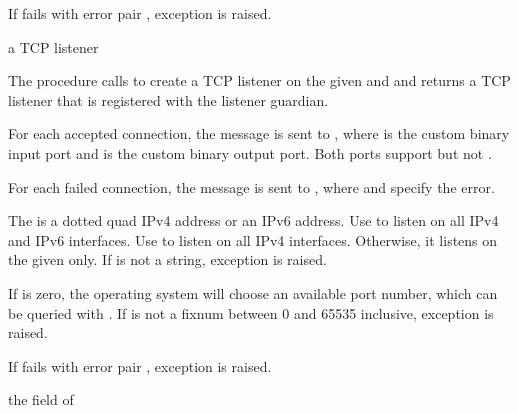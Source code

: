 If  fails with error pair , exception  is raised.

\begin{procedure}
\end{procedure}
\returns{} a TCP listener

The  procedure calls  to
create a TCP listener on the given  and 
and returns a TCP listener that is registered with the listener
guardian.

For each accepted connection, the message  is sent to , where
 is the custom binary input port and  is the custom
binary output port. Both ports support  but not
.

For each failed connection, the message  is sent to ,
where  and  specify the error.

The  is a dotted quad IPv4 address or an IPv6
address. Use  to listen on all IPv4 and IPv6 interfaces.
Use  to listen on all IPv4 interfaces. Otherwise, it
listens on the given  only. If  is not a
string, exception  is
raised.

If  is zero, the operating system will choose an
available port number, which can be queried with
. If  is not a fixnum
between 0 and 65535 inclusive, exception  is raised.

If  fails with error pair , exception  is raised.

\begin{procedure}
\end{procedure}
\returns{} the  field of 

